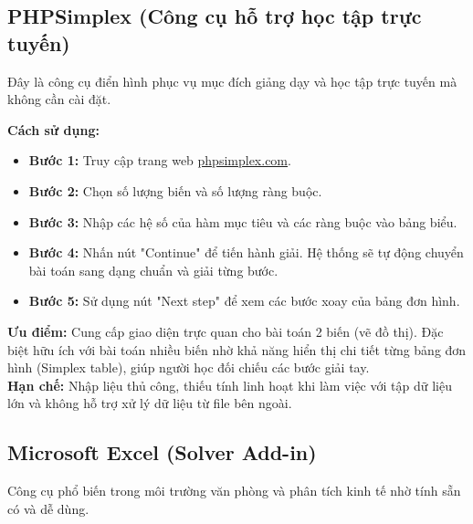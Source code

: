 \documentclass[12pt,a4paper]{article}
\begin{document}
\subsection{PHPSimplex (Công cụ hỗ trợ học tập trực tuyến)}
Đây là công cụ điển hình phục vụ mục đích giảng dạy và học tập trực tuyến mà không cần cài đặt.

\medskip
\noindent\textbf{Cách sử dụng:}
\begin{itemize}[label=\textcolor{secondary}{$\circ$}]
    \item \textbf{Bước 1:} Truy cập trang web \url{phpsimplex.com}.
    \item \textbf{Bước 2:} Chọn số lượng biến và số lượng ràng buộc.
    \item \textbf{Bước 3:} Nhập các hệ số của hàm mục tiêu và các ràng buộc vào bảng biểu.
    \item \textbf{Bước 4:} Nhấn nút "Continue" để tiến hành giải. Hệ thống sẽ tự động chuyển bài toán sang dạng chuẩn và giải từng bước.
    \item \textbf{Bước 5:} Sử dụng nút "Next step" để xem các bước xoay của bảng đơn hình.
\end{itemize}
\textbf{Ưu điểm:} Cung cấp giao diện trực quan cho bài toán 2 biến (vẽ đồ thị). Đặc biệt hữu ích với bài toán nhiều biến nhờ khả năng hiển thị chi tiết từng bảng đơn hình (Simplex table), giúp người học đối chiếu các bước giải tay.\\
\textbf{Hạn chế:} Nhập liệu thủ công, thiếu tính linh hoạt khi làm việc với tập dữ liệu lớn và không hỗ trợ xử lý dữ liệu từ file bên ngoài.

\subsection{Microsoft Excel (Solver Add-in)}
Công cụ phổ biến trong môi trường văn phòng và phân tích kinh tế nhờ tính sẵn có và dễ dùng.
\end{document}
